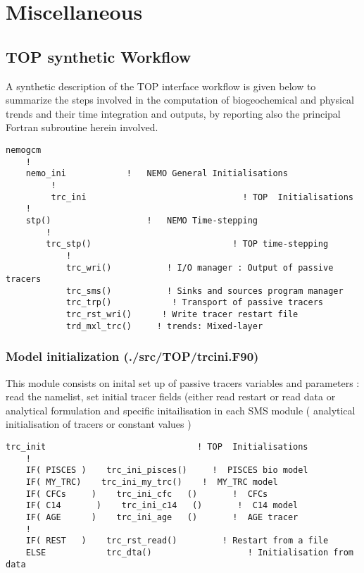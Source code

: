\documentclass[../main/TOP_manual]{subfiles}
\begin{document}
\chapter{Miscellaneous}

\section{TOP synthetic Workflow}

A synthetic description of the TOP interface workflow is given below to summarize the steps involved in the computation of biogeochemical and physical trends and their time integration and outputs, by reporting also the principal Fortran subroutine herein involved.


\begin{verbatim}
nemogcm
    !                      
    nemo_ini            !   NEMO General Initialisations
         !                   
         trc_ini                               ! TOP  Initialisations
    !
    stp()                   !   NEMO Time-stepping
        !
        trc_stp()                            ! TOP time-stepping
            !
            trc_wri()           ! I/O manager : Output of passive tracers 
            trc_sms()           ! Sinks and sources program manager
            trc_trp()            ! Transport of passive tracers
            trc_rst_wri()      ! Write tracer restart file
            trd_mxl_trc()     ! trends: Mixed-layer
\end{verbatim}

\subsection{Model initialization (./src/TOP/trcini.F90)}

This module consists on inital set up of passive tracers variables and parameters  : read the namelist, set initial tracer fields (either read restart or read data or analytical formulation and  specific initailisation in each SMS module  ( analytical initialisation of tracers or constant values )

\begin{verbatim}
trc_init                              ! TOP  Initialisations 
    !    
    IF( PISCES )    trc_ini_pisces()     !  PISCES bio model
    IF( MY_TRC)    trc_ini_my_trc()    !  MY_TRC model
    IF( CFCs     )    trc_ini_cfc   ()       !  CFCs
    IF( C14       )    trc_ini_c14   ()       !  C14 model
    IF( AGE      )    trc_ini_age   ()       !  AGE tracer
    !
    IF( REST   )    trc_rst_read()         ! Restart from a file  
    ELSE            trc_dta()                   ! Initialisation from data
\end{verbatim}
\end{document}
